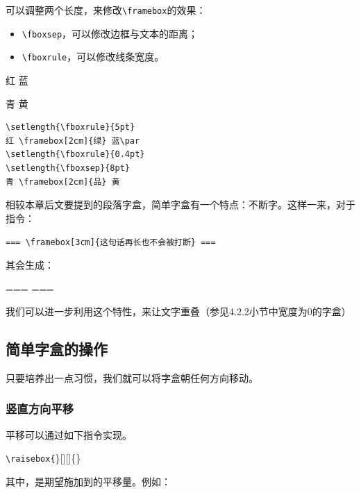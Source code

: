 可以调整两个长度，来修改\verb|\framebox|的效果：

\begin{itemize}
  \item \verb|\fboxsep|，可以修改边框与文本的距离；
  \item \verb|\fboxrule|，可以修改线条宽度。
\end{itemize}

\begin{codelist}[4.11]{
  \setlength{\fboxrule}{5pt}
红  蓝\par
\setlength{\fboxrule}{0.4pt}
\setlength{\fboxsep}{8pt}
青  黄
}
\begin{verbatim}
\setlength{\fboxrule}{5pt}
红 \framebox[2cm]{绿} 蓝\par
\setlength{\fboxrule}{0.4pt}
\setlength{\fboxsep}{8pt}
青 \framebox[2cm]{品} 黄\end{verbatim}
\end{codelist}

\begin{exclamation}
  相较本章后文要提到的段落字盒，简单字盒有一个特点：不断字。这样一来，对于指令：

  \verb|=== \framebox[3cm]{这句话再长也不会被打断} ===|

  其会生成：

  ===  ===

  我们可以进一步利用这个特性，来让文字重叠（参见4.2.2小节中宽度为0的字盒）
\end{exclamation}

\subsection{简单字盒的操作}

只要培养出一点习惯，我们就可以将字盒朝任何方向移动。

\subsubsection{竖直方向平移}

平移可以通过如下指令实现。

\begin{dmd}
\verb|\raisebox{|\}[][]\{\}
\end{dmd}

其中，是期望施加到的平移量。例如：

